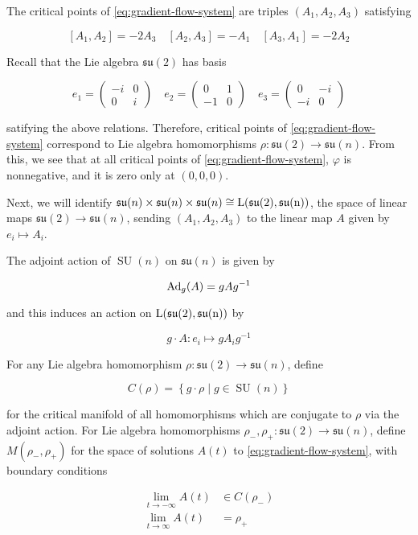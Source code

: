 \documentclass{article}
\DeclareMathOperator{\SU}{SU}
\newcommand{\su}{\mathfrak{su}}
\begin{document}
The critical points of \cref{eq:gradient-flow-system} are triples \((A_1, A_2, A_3)\) satisfying

\[[A_1, A_2] = -2A_3 \quad [A_2, A_3] = -A_1 \quad [A_3, A_1] = -2A_2\]

Recall that the Lie algebra \(\su(2)\) has basis

\[e_1 = \begin{pmatrix}
    -i & 0 \\
    0 & i
\end{pmatrix} \quad e_2 = \begin{pmatrix}
    0 & 1 \\
    -1 & 0
\end{pmatrix} \quad e_3 = \begin{pmatrix}
    0 & -i \\
    -i & 0
\end{pmatrix}\]

satifying the above relations. Therefore, critical points of \cref{eq:gradient-flow-system} correspond to Lie algebra homomorphisms \(\rho : \su(2) \to \su(n)\). From this, we see that at all critical points of \cref{eq:gradient-flow-system}, \(\varphi\) is nonnegative, and it is zero only at \((0, 0, 0)\).

Next, we will identify \(\su(n) \times \su(n) \times \su(n) \cong \rm L(\su(2), \su(n))\), the space of linear maps \(\su(2) \to \su(n)\), sending \((A_1, A_2, A_3)\) to the linear map \(A\) given by \(e_i \mapsto A_i\).

The adjoint action of \(\SU(n)\) on \(\su(n)\) is given by

\[\operatorname{Ad}_g(A) = gAg^{-1}\]

and this induces an action on \(\rm L(\su(2), \su(n))\) by

\[g \cdot A : e_i \mapsto gA_ig^{-1}\]

For any Lie algebra homomorphism \(\rho : \su(2) \to \su(n)\), define

\[C(\rho) = \left\{g \cdot \rho \mid g \in \SU(n)\right\}\]

for the critical manifold of all homomorphisms which are conjugate to \(\rho\) via the adjoint action. For Lie algebra homomorphisms \(\rho_-, \rho_+ : \su(2) \to \su(n)\), define \(M(\rho_-, \rho_+)\) for the space of solutions \(A(t)\) to \cref{eq:gradient-flow-system}, with boundary conditions

\begin{equation}
    \label{eq:boundary-conditions}
    \begin{split}
        \lim_{t\to-\infty}A(t) &\in C(\rho_-) \\
        \lim_{t\to\infty}A(t) &= \rho_+
    \end{split}
\end{equation}
\end{document}
